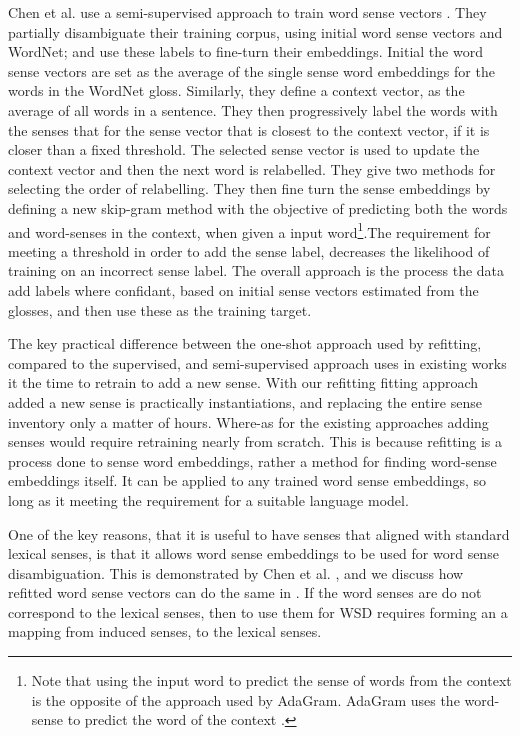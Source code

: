 \documentclass{sig-alternate}
\begin{document}
Chen et al. use a semi-supervised approach to train word sense vectors \parencite{Chen2014}. They partially disambiguate their training corpus, using initial word sense vectors and WordNet; and use these labels to fine-turn their embeddings. 
Initial the word sense vectors are set as the average of the single sense word embeddings\parencite{mikolov2013efficient} for the words in the WordNet gloss.
Similarly, they define a context vector, as the average of all words in a sentence.
They then progressively label the words with the senses
that for the sense vector that is closest to the context vector, if it is closer than a fixed threshold.
The selected sense vector is used to update the context vector and then the next word is relabelled. They give two methods for selecting the order of relabelling.
They then fine turn the sense embeddings by defining a new skip-gram method with the objective of predicting both the words and word-senses in the context, when given a input word\footnote{Note that using the input word to predict the sense of words from the context is the opposite of the approach used by AdaGram. AdaGram uses the word-sense to predict the word of the context \parencite{AdaGrams}.}.The requirement for meeting a threshold in order to add the sense label,  decreases the likelihood of training on an incorrect sense label. The overall approach is the process the data add labels where confidant, based on initial sense vectors estimated from the glosses, and then use these as the training target.

The key practical difference between the one-shot approach used by refitting, compared to the supervised, and semi-supervised approach uses in existing works it the time to retrain to add a new sense. With our refitting fitting approach added a new sense is practically instantiations, and replacing the entire sense inventory only a matter of hours. Where-as for the existing approaches adding senses would require retraining nearly from scratch. This is because refitting is a process done to sense word embeddings, rather a method for finding word-sense embeddings itself. It can be applied to any trained word sense embeddings, so long as it meeting the requirement for a suitable language model.

One of the key reasons, that it is useful to have senses that aligned with standard lexical senses, is that it allows word sense embeddings to be used for word sense disambiguation. This is demonstrated by Chen et al.  \parencite{Chen2014}, and we discuss how refitted word sense vectors can do the same in . If the word senses are do not correspond to the lexical senses, then to use them for WSD requires forming an a mapping from induced senses, to the lexical senses.
\end{document}
